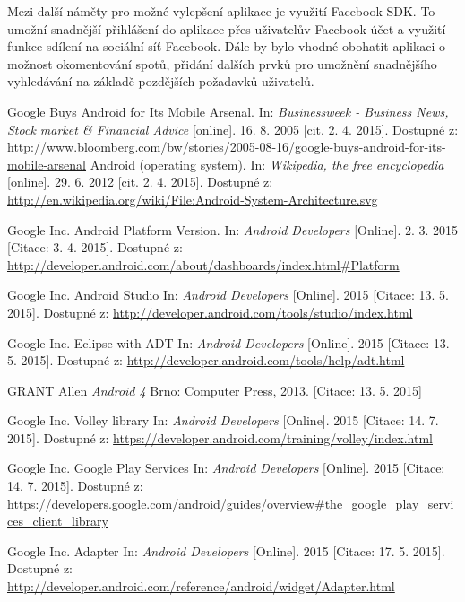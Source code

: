 \documentclass[12pt]{article}
\begin{document}
Mezi další náměty pro možné vylepšení aplikace je využití Facebook SDK. To umožní snadnější přihlášení do aplikace přes uživatelův Facebook účet a využití funkce sdílení na sociální síť Facebook. Dále by bylo vhodné obohatit aplikaci o možnost okomentování spotů, přidání dalších prvků pro umožnění snadnějšího vyhledávání na základě pozdějších požadavků uživatelů.
\newpage
\begin{thebibliography}{1} %
 Google Buys Android for Its Mobile Arsenal. In: \emph{Businessweek - Business News, Stock market \& Financial Advice} [online]. 16. 8. 2005 [cit. 2. 4. 2015]. Dostupné
z: \url{http://www.bloomberg.com/bw/stories/2005-08-16/google-buys-android-for-its-mobile-arsenal}
 Android (operating system). In: \emph{Wikipedia, the free encyclopedia} [online]. 29. 6. 2012 [cit. 2. 4. 2015]. Dostupné z: \url{http://en.wikipedia.org/wiki/File:Android-System-Architecture.svg}

 Google Inc. Android Platform Version. In: \emph{Android Developers}
[Online]. 2. 3. 2015 [Citace: 3. 4. 2015]. Dostupné z: \url{http://developer.android.com/about/dashboards/index.html#Platform}

 Google Inc. Android Studio In: \emph{Android Developers}
[Online]. 2015 [Citace: 13. 5. 2015]. Dostupné z: \url{http://developer.android.com/tools/studio/index.html}

 Google Inc. Eclipse with ADT In: \emph{Android Developers}
[Online]. 2015 [Citace: 13. 5. 2015]. Dostupné z: \url{http://developer.android.com/tools/help/adt.html}

 GRANT Allen \emph{Android 4}
	Brno: Computer Press, 2013.
		[Citace: 13. 5. 2015]

 Google Inc. Volley library In: \emph{Android Developers}
[Online]. 2015 [Citace: 14. 7. 2015]. Dostupné z:
\url{https://developer.android.com/training/volley/index.html}

 Google Inc. Google Play Services In: \emph{Android Developers}
[Online]. 2015 [Citace: 14. 7. 2015]. Dostupné z:
\url{https://developers.google.com/android/guides/overview#the_google_play_services_client_library}

 Google Inc. Adapter In: \emph{Android Developers}
[Online]. 2015 [Citace: 17. 5. 2015]. Dostupné z: \url{http://developer.android.com/reference/android/widget/Adapter.html}


\end{thebibliography}
\end{document}
